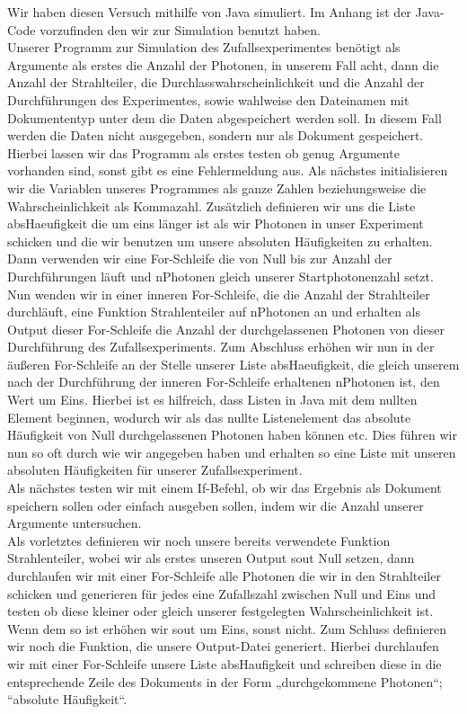 Wir haben diesen Versuch mithilfe von Java simuliert. Im Anhang ist der Java-Code vorzufinden den wir zur Simulation benutzt haben.\\
Unserer Programm zur Simulation des Zufallsexperimentes benötigt als Argumente als erstes die Anzahl der Photonen, in unserem Fall acht, dann die Anzahl der Strahlteiler, die Durchlasswahrscheinlichkeit und die Anzahl der Durchführungen des Experimentes, sowie wahlweise den Dateinamen mit Dokumententyp unter dem die Daten abgespeichert werden soll. In diesem Fall werden die Daten nicht ausgegeben, sondern nur als Dokument gespeichert.\\
Hierbei lassen wir das Programm als erstes testen ob genug Argumente vorhanden sind, sonst gibt es eine Fehlermeldung aus. Als nächstes initialisieren wir die Variablen unseres Programmes als ganze Zahlen beziehungsweise die Wahrscheinlichkeit als Kommazahl. Zusätzlich definieren wir uns die Liste absHaeufigkeit die um eins länger ist als wir Photonen in unser Experiment schicken und die wir benutzen um unsere absoluten Häufigkeiten zu erhalten.\\
Dann verwenden wir eine For-Schleife die von Null bis zur Anzahl der Durchführungen läuft und nPhotonen gleich unserer Startphotonenzahl setzt. Nun wenden wir in einer inneren For-Schleife, die die Anzahl der Strahlteiler durchläuft, eine Funktion Strahlenteiler auf nPhotonen an und erhalten als Output dieser For-Schleife die Anzahl der durchgelassenen Photonen von dieser Durchführung des Zufallsexperiments. Zum Abschluss erhöhen wir nun in der äußeren For-Schleife an der Stelle unserer Liste absHaeufigkeit, die gleich unserem nach der Durchführung der inneren For-Schleife erhaltenen nPhotonen ist, den Wert um Eins. Hierbei ist es hilfreich, dass Listen in Java mit dem nullten Element beginnen, wodurch wir als das nullte Listenelement das absolute Häufigkeit von Null durchgelassenen Photonen haben können etc. Dies führen wir nun so oft durch wie wir angegeben haben und erhalten so eine Liste mit unseren absoluten Häufigkeiten für unserer Zufallsexperiment.\\
Als nächstes testen wir mit einem If-Befehl, ob wir das Ergebnis als Dokument speichern sollen oder einfach ausgeben sollen, indem wir die Anzahl unserer Argumente untersuchen.\\
Als vorletztes definieren wir noch unsere bereits verwendete Funktion Strahlenteiler, wobei wir als erstes unseren Output sout Null setzen, dann durchlaufen wir mit einer For-Schleife alle Photonen die wir in den Strahlteiler schicken und generieren für jedes eine Zufallszahl zwischen Null und Eins und testen ob diese kleiner oder gleich unserer festgelegten Wahrscheinlichkeit ist. Wenn dem so ist erhöhen wir sout um Eins, sonst nicht. Zum Schluss definieren wir noch die Funktion, die unsere Output-Datei generiert. Hierbei durchlaufen wir mit einer For-Schleife unsere Liste absHaufigkeit und schreiben diese in die entsprechende Zeile des Dokuments in der Form „durchgekommene Photonen“; “absolute Häufigkeit“.


